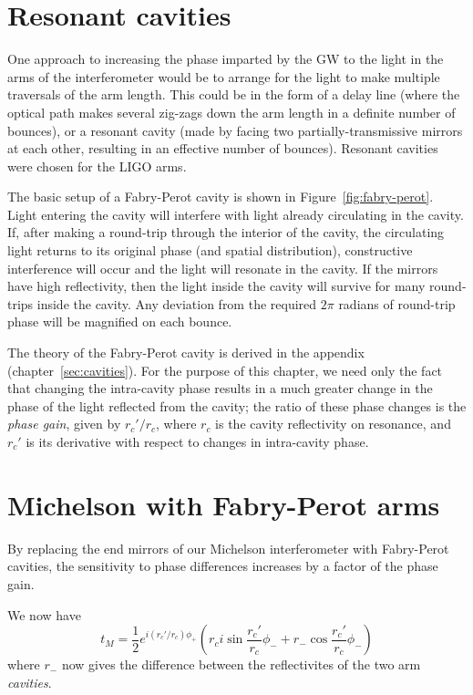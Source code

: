 \section{Resonant cavities}

One approach to increasing the phase imparted by the GW to the light
in the arms of the interferometer would be to arrange for the light to
make multiple traversals of the arm length.  This could be in the form
of a delay line (where the optical path makes several zig-zags down
the arm length in a definite number of bounces), or a resonant cavity
(made by facing two partially-transmissive mirrors at each other,
resulting in an effective number of bounces).  Resonant cavities were
chosen for the LIGO arms. 

The basic setup of a Fabry-Perot cavity is shown in Figure~\ref{fig:fabry-perot}.
Light entering the cavity will interfere with light already
circulating in the cavity.  If, after making a round-trip through the
interior of the cavity, the circulating light returns to its original
phase (and spatial distribution), constructive interference will occur
and the light will resonate in the cavity.  If the mirrors have high
reflectivity, then the light inside the cavity will survive for many
round-trips inside the cavity. Any deviation from the required $2\pi$
radians of round-trip phase will be magnified on each bounce.

The theory of the Fabry-Perot cavity is derived in the appendix
(chapter~\ref{sec:cavities}).  For the purpose of this chapter, we
need only the fact that changing the intra-cavity phase results in a
much greater change in the phase of the light reflected from the
cavity; the ratio of these phase changes is the \emph{phase gain},
given by $r_c'/r_c$, where $r_c$ is the cavity reflectivity on
resonance, and $r_c'$ is its derivative with respect to changes in
intra-cavity phase.

\section{Michelson with Fabry-Perot arms}

By replacing the end mirrors of our Michelson interferometer with
Fabry-Perot cavities, the sensitivity to phase differences increases
by a factor of the phase gain.  

We now have
\begin{equation}
t_M  = \frac{1}{2} e^{i(r_c'/r_c)\phi_+} \left( r_c i \sin \frac{r_c'}{r_c}\phi_- + r_- \cos \frac{r_c'}{r_c}\phi_- \right)
\end{equation}
where $r_-$ now gives the difference between the reflectivites of the
two arm \emph{cavities}.

